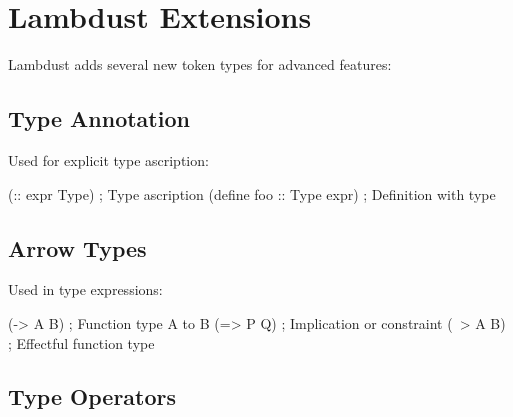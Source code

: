 \section{Lambdust Extensions}
\label{sec:extensions}


Lambdust adds several new token types for advanced features:

\subsection{Type Annotation}
\label{subsec:type-annotation}

\begin{grammar}
\end{grammar}

Used for explicit type ascription:
\begin{lambdustcode}
(:: expr Type)              ; Type ascription
(define foo :: Type expr)   ; Definition with type
\end{lambdustcode}

\subsection{Arrow Types}
\label{subsec:arrows}

\begin{grammar}
\end{grammar}

Used in type expressions:
\begin{lambdustcode}
(-> A B)        ; Function type A to B
(=> P Q)        ; Implication or constraint  
(~> A B)        ; Effectful function type
\end{lambdustcode}

\subsection{Type Operators}
\label{subsec:type-ops}

\begin{grammar}
\end{grammar}

